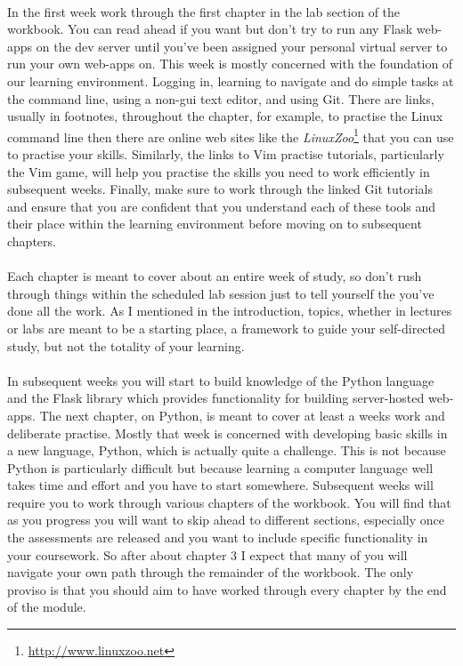 \documentclass[12pt, a4paper, oneside]{book}
\begin{document}
\paragraph{} In the first week work through the first chapter in the lab section of the workbook. You can read ahead if you want but don't try to run any Flask web-apps on the dev server until you've been assigned your personal virtual server to run your own web-apps on. This week is mostly concerned with the foundation of our learning environment. Logging in, learning to navigate and do simple tasks at the command line, using a non-gui text editor, and using Git. There are links, usually in footnotes, throughout the chapter, for example, to practise the Linux command line then there are online web sites like the \emph{LinuxZoo}\footnote{\url{http://www.linuxzoo.net}} that you can use to practise your skills. Similarly, the links to Vim practise tutorials, particularly the Vim game, will help you practise the skills you need to work efficiently in subsequent weeks. Finally, make sure to work through the linked Git tutorials and ensure that you are confident that you understand each of these tools and their place within the learning environment before moving on to subsequent chapters. 

\paragraph{} Each chapter is meant to cover about an entire week of study, so don't rush through things within the scheduled lab session just to tell yourself the you've done all the work. As I mentioned in the introduction, topics, whether in lectures or labs are meant to be a starting place, a framework to guide your self-directed study, but not the totality of your learning. 

\paragraph{} In subsequent weeks you will start to build knowledge of the Python language and the Flask library which provides functionality for building server-hosted web-apps. The next chapter, on Python, is meant to cover at least a weeks work and deliberate practise. Mostly that week is concerned with developing basic skills in a new language, Python, which is actually quite a challenge. This is not because Python is particularly difficult but because learning a computer language well takes time and effort and you have to start somewhere. Subsequent weeks will require you to work through various chapters of the workbook. You will find that as you progress you will want to skip ahead to different sections, especially once the assessments are released and you want to include specific functionality in your coursework. So after about chapter 3 I expect that many of you will navigate your own path through the remainder of the workbook. The only proviso is that you should aim to have worked through every chapter by the end of the module.
\end{document}
